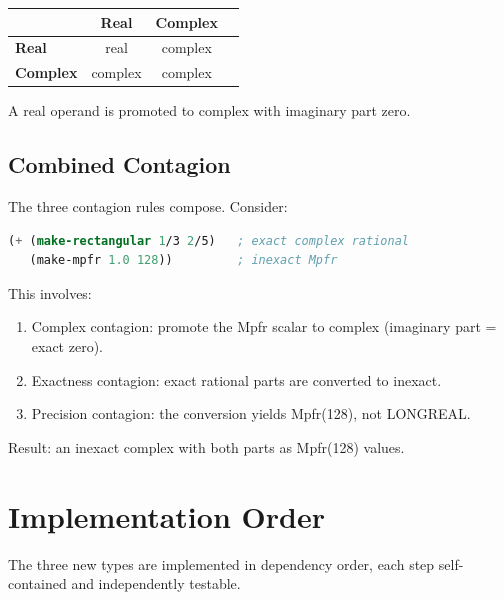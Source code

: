 \documentclass[12pt]{article}
\begin{document}
\begin{center}
\begin{tabular}{lccc}
\toprule
& \textbf{Real} & \textbf{Complex} \\
\midrule
\textbf{Real}    & real    & complex \\
\textbf{Complex} & complex & complex \\
\bottomrule
\end{tabular}
\end{center}

\noindent A real operand is promoted to complex with imaginary
part zero.

\subsection{Combined Contagion}

The three contagion rules compose.  Consider:

\begin{lstlisting}[language=Scheme]
(+ (make-rectangular 1/3 2/5)   ; exact complex rational
   (make-mpfr 1.0 128))         ; inexact Mpfr
\end{lstlisting}

\noindent This involves:
\begin{enumerate}[nosep]
\item Complex contagion: promote the Mpfr scalar to complex
  (imaginary part = exact zero).
\item Exactness contagion: exact rational parts are converted
  to inexact.
\item Precision contagion: the conversion yields Mpfr(128), not
  LONGREAL.
\end{enumerate}

\noindent Result: an inexact complex with both parts as
Mpfr(128) values.


\section{Implementation Order}
\label{sec:order}

The three new types are implemented in dependency order, each step
self-contained and independently testable.
\end{document}
